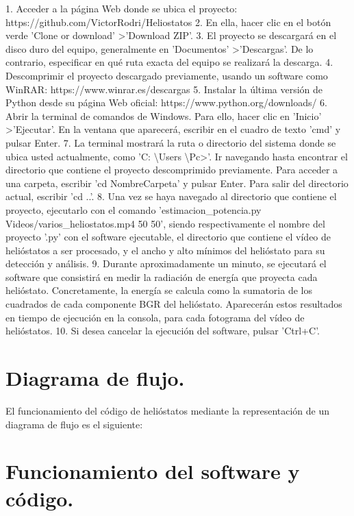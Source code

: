 \documentclass[12pt]{article}
\begin{document}
1. Acceder a la página Web donde se ubica el proyecto: https://github.com/VictorRodri/Heliostatos
2. En ella, hacer clic en el botón verde 'Clone or download' \textgreater 'Download ZIP'.
3. El proyecto se descargará en el disco duro del equipo, generalmente en 'Documentos' \textgreater 'Descargas'. De lo contrario, especificar en qué ruta exacta del equipo se realizará la descarga.
4. Descomprimir el proyecto descargado previamente, usando un software como WinRAR: https://www.winrar.es/descargas
5. Instalar la última versión de Python desde su página Web oficial: https://www.python.org/downloads/
6. Abrir la terminal de comandos de Windows. Para ello, hacer clic en 'Inicio' \textgreater 'Ejecutar'. En la ventana que aparecerá, escribir en el cuadro de texto 'cmd' y pulsar Enter.
7. La terminal mostrará la ruta o directorio del sistema donde se ubica usted actualmente, como 'C: \textbackslash Users \textbackslash Pc\textgreater'. Ir navegando hasta encontrar el directorio que contiene el proyecto descomprimido previamente. Para acceder a una carpeta, escribir 'cd NombreCarpeta' y pulsar Enter. Para salir del directorio actual, escribir 'cd ..'.
8. Una vez se haya navegado al directorio que contiene el proyecto, ejecutarlo con el comando 'estimacion\_potencia.py Videos/varios\_heliostatos.mp4 50 50', siendo respectivamente el nombre del proyecto '.py' con el software ejecutable, el directorio que contiene el vídeo de helióstatos a ser procesado, y el ancho y alto mínimos del helióstato para su detección y análisis.
9. Durante aproximadamente un minuto, se ejecutará el software que consistirá en medir la radiación de energía que proyecta cada helióstato. Concretamente, la energía se calcula como la sumatoria de los cuadrados de cada componente BGR del helióstato. Aparecerán estos resultados en tiempo de ejecución en la consola, para cada fotograma del vídeo de helióstatos.
10. Si desea cancelar la ejecución del software, pulsar 'Ctrl+C'.

\section{Diagrama de flujo.}

El funcionamiento del código de helióstatos mediante la representación de un diagrama de flujo es el siguiente:

\section{Funcionamiento del software y código.}
\end{document}
